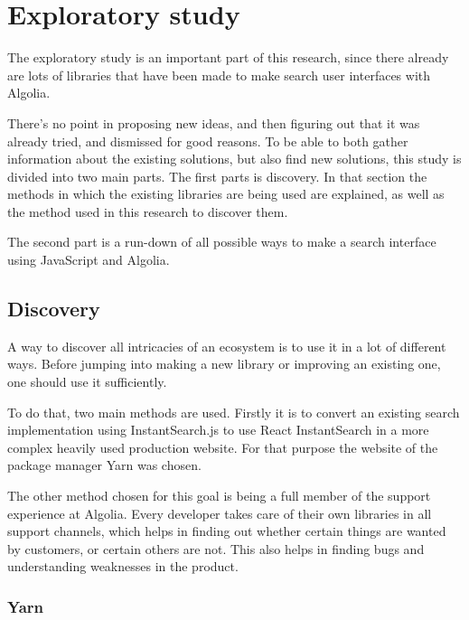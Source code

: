 
\chapter{Exploratory study} %
\label{chp:exploratory_study}

The exploratory study is an important part of this research, since there already are lots of libraries that have been made to make search user interfaces with Algolia.

There's no point in proposing new ideas, and then figuring out that it was already tried, and dismissed for good reasons. To be able to both gather information about the existing solutions, but also find new solutions, this study is divided into two main parts. The first parts is discovery. In that section the methods in which the existing libraries are being used are explained, as well as the method used in this research to discover them. 

The second part is a run-down of all possible ways to make a search interface using JavaScript and Algolia. 

\section{Discovery}
\label{sec:discovery}

A way to discover all intricacies of an ecosystem is to use it in a lot of different ways. Before jumping into making a new \gls{library} or improving an existing one, one should use it sufficiently.

To do that, two main methods are used. Firstly it is to convert an existing search implementation using InstantSearch.js\cite{instantsearch-js} to use React InstantSearch in a more complex heavily used production website. For that purpose the website of the package manager Yarn\cite{yarn-site} was chosen.

The other method chosen for this goal is being a full member of the support experience at Algolia. Every developer takes care of their own libraries in all support channels, which helps in finding out whether certain things are wanted by customers, or certain others are not. This also helps in finding bugs and understanding weaknesses in the product.

\subsection{Yarn} %
\label{ssec:yarn}

